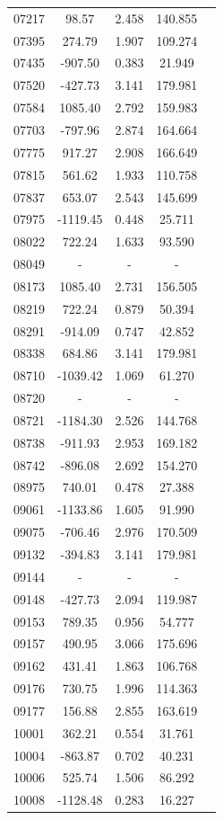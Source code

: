 {\begin{longtable}{ccccc}
07217 & 98.57 & 2.458 & 140.855\\
07395 & 274.79 & 1.907 & 109.274\\
07435 & -907.50 & 0.383 & 21.949\\
07520 & -427.73 & 3.141 & 179.981\\
07584 & 1085.40 & 2.792 & 159.983\\
07703 & -797.96 & 2.874 & 164.664\\
07775 & 917.27 & 2.908 & 166.649\\
07815 & 561.62 & 1.933 & 110.758\\
07837 & 653.07 & 2.543 & 145.699\\
07975 & -1119.45 & 0.448 & 25.711\\
08022 & 722.24 & 1.633 & 93.590\\
08049 & - & - & - \\
08173 & 1085.40 & 2.731 & 156.505\\
08219 & 722.24 & 0.879 & 50.394\\
08291 & -914.09 & 0.747 & 42.852\\
08338 & 684.86 & 3.141 & 179.981\\
08710 & -1039.42 & 1.069 & 61.270\\
08720 & - & - & - \\
08721 & -1184.30 & 2.526 & 144.768\\
08738 & -911.93 & 2.953 & 169.182\\
08742 & -896.08 & 2.692 & 154.270\\
08975 & 740.01 & 0.478 & 27.388\\
09061 & -1133.86 & 1.605 & 91.990\\
09075 & -706.46 & 2.976 & 170.509\\
09132 & -394.83 & 3.141 & 179.981\\
09144 & - & - & - \\
09148 & -427.73 & 2.094 & 119.987\\
09153 & 789.35 & 0.956 & 54.777\\
09157 & 490.95 & 3.066 & 175.696\\
09162 & 431.41 & 1.863 & 106.768\\
09176 & 730.75 & 1.996 & 114.363\\
09177 & 156.88 & 2.855 & 163.619\\
10001 & 362.21 & 0.554 & 31.761\\
10004 & -863.87 & 0.702 & 40.231\\
10006 & 525.74 & 1.506 & 86.292\\
10008 & -1128.48 & 0.283 & 16.227\\

\end{longtable}}
